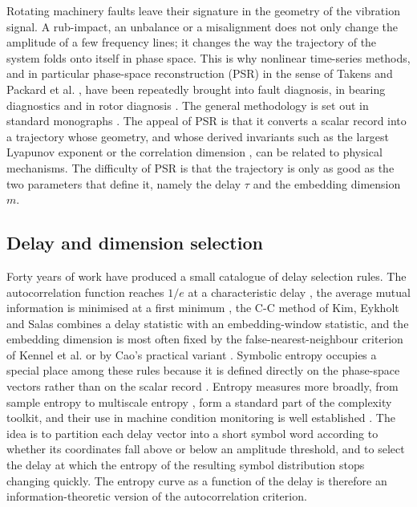\documentclass[10pt,a4paper,twocolumn]{article}
\begin{document}
Rotating machinery faults leave their signature in the geometry of the
vibration signal.  A rub-impact, an unbalance or a misalignment does not only
change the amplitude of a few frequency lines; it changes the way the
trajectory of the system folds onto itself in phase space.  This is why
nonlinear time-series methods, and in particular phase-space reconstruction
(PSR) in the sense of Takens \citep{takens1981} and Packard et al.
\citep{packard1980}, have been repeatedly brought into fault diagnosis, in
bearing diagnostics \citep{randall2011,antoni2007,smith2015} and in rotor
diagnosis \citep{zhao2025}.  The general methodology is set out in standard
monographs \citep{kantz2004,schreiber1999}.  The
appeal of PSR is that it converts a scalar record into a trajectory whose
geometry, and whose derived invariants such as the largest Lyapunov exponent
\citep{rosenstein1993} or the correlation dimension
\citep{grassberger1983}, can be related to physical mechanisms.  The
difficulty of PSR is that the trajectory is only as good as the two
parameters that define it, namely the delay $\tau$ and the embedding
dimension $m$.

\subsection{Delay and dimension selection}

Forty years of work have produced a small catalogue of delay selection rules.
The autocorrelation function reaches $1/e$ at a characteristic delay
\citep{abarbanel1996}, the average mutual information is minimised at a
first minimum \citep{fraser1986}, the C-C method of Kim, Eykholt and Salas
\citep{kim1999} combines a delay statistic with an embedding-window
statistic, and the embedding dimension is most often fixed by the
false-nearest-neighbour criterion of Kennel et al. \citep{kennel1992} or by
Cao's practical variant \citep{cao1997}.  Symbolic entropy occupies a
special place among these rules because it is defined directly on the
phase-space vectors rather than on the scalar record
\citep{shannon1948,daw2003,bandt2002}.  Entropy measures more broadly, from
sample entropy \citep{richman2000} to multiscale entropy \citep{costa2002},
form a standard part of the complexity toolkit, and their use in machine
condition monitoring is well established \citep{minhas2021}.  The idea is to partition each
delay vector into a short symbol word according to whether its coordinates
fall above or below an amplitude threshold, and to select the delay at which
the entropy of the resulting symbol distribution stops changing quickly.  The
entropy curve as a function of the delay is therefore an information-theoretic
version of the autocorrelation criterion.
\end{document}
